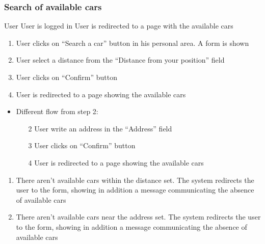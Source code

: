 \subsubsection{Search of available cars}\label{search}
{User}
{}
{User is logged in}
{User is redirected to a page with the available cars}
{
\begin{enumerate}
	\item User clicks on ``Search a car'' button in his personal area. A form is shown
	\item User select a distance from the ``Distance from your position'' field
	\item User clicks on ``Confirm'' button
	\item User is redirected to a page showing the available cars
\end{enumerate}
}
{
\begin{itemize}
\item Different flow from step 2:
	\begin{enumerate}
	\item[2] User write an address in the ``Address'' field 
	\item[3] User clicks on ``Confirm'' button
	\item[4] User is redirected to a page showing the available cars
 
\end{enumerate}

\end{itemize}


}
{
\begin{enumerate}
\item There aren't available cars within the distance set. The system redirects the user to the form, showing in addition a message communicating the absence of available cars
\item There aren't available cars near the address set. The system redirects the user to the form, showing in addition a message communicating the absence of available cars

\end{enumerate}
}
\pagebreak


